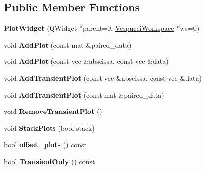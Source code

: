\subsection*{Public Member Functions}
\begin{DoxyCompactItemize}
\item 
{\bfseries Plot\+Widget} (Q\+Widget $\ast$parent=0, \hyperlink{class_vespucci_workspace}{Vespucci\+Workspace} $\ast$ws=0)\hypertarget{class_plot_widget_acc4af6980071c67f1ce9f94d5c250d1b}{}\label{class_plot_widget_acc4af6980071c67f1ce9f94d5c250d1b}

\item 
void {\bfseries Add\+Plot} (const mat \&paired\+\_\+data)\hypertarget{class_plot_widget_aa7a06c9654235b532a3d6466d5a05c5a}{}\label{class_plot_widget_aa7a06c9654235b532a3d6466d5a05c5a}

\item 
void {\bfseries Add\+Plot} (const vec \&abscissa, const vec \&data)\hypertarget{class_plot_widget_a5056752f5a0db18ffeace9c14300a7d5}{}\label{class_plot_widget_a5056752f5a0db18ffeace9c14300a7d5}

\item 
void {\bfseries Add\+Transient\+Plot} (const vec \&abscissa, const vec \&data)\hypertarget{class_plot_widget_a3b02e9e2efb80f1ba515da05147f8ad4}{}\label{class_plot_widget_a3b02e9e2efb80f1ba515da05147f8ad4}

\item 
void {\bfseries Add\+Transient\+Plot} (const mat \&paired\+\_\+data)\hypertarget{class_plot_widget_a22354181c4ad44f763c194d0d31ceab1}{}\label{class_plot_widget_a22354181c4ad44f763c194d0d31ceab1}

\item 
void {\bfseries Remove\+Transient\+Plot} ()\hypertarget{class_plot_widget_ad71e6377a80ea49059471f138d61102c}{}\label{class_plot_widget_ad71e6377a80ea49059471f138d61102c}

\item 
void {\bfseries Stack\+Plots} (bool stack)\hypertarget{class_plot_widget_afcd9d95c39bf712b4e5058a4206df084}{}\label{class_plot_widget_afcd9d95c39bf712b4e5058a4206df084}

\item 
bool {\bfseries offset\+\_\+plots} () const \hypertarget{class_plot_widget_a667cbeef3dd56be85fa5596adeb2c3fc}{}\label{class_plot_widget_a667cbeef3dd56be85fa5596adeb2c3fc}

\item 
bool {\bfseries Transient\+Only} () const \hypertarget{class_plot_widget_a17c3dbba0884cb8547cd1900400c12aa}{}\label{class_plot_widget_a17c3dbba0884cb8547cd1900400c12aa}

\end{DoxyCompactItemize}


